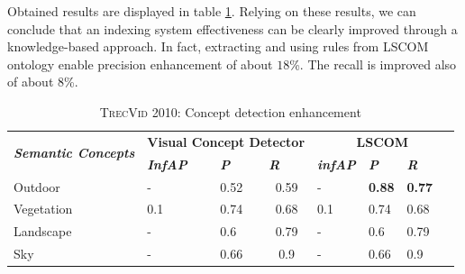 		Obtained results are displayed in table \ref{lscom2}. Relying on these results, 
		we can conclude that an indexing system effectiveness can be clearly improved through 
		a knowledge-based approach. In fact, extracting and using rules from LSCOM ontology enable
		precision enhancement of about $18$\%. The recall is improved also of about $8$\%.

		\begin{table}[h]
			\centering
			\caption{\textsc{TrecVid 2010}: Concept detection enhancement}
			\label{lscom2}
			\begin{tabular}{lp{1.2cm}p{1.2cm}p{1.2cm}p{1.2cm}p{1.2cm}p{1.2cm}}\hline
			\multicolumn{1}{c}{\multirow{2}{*}{\textit{\textbf{Semantic Concepts}}}} & \multicolumn{3}{c}{\textbf{Visual 				Concept Detector}}                                            & \multicolumn{3}{c}{\textbf								{LSCOM}}                                                                         \\ \cline{2-7} 
\multicolumn{1}{c}{}                                                     & \textit{\textbf{InfAP}}   & \textit{\textbf{P}}      & \multicolumn{1}{l|}{\textit{\textbf{R}}} & \textit{\textbf{infAP}}            & \textit{\textbf{P}}               & \textit{\textbf{R~~~~}}               \\ \hline
\multicolumn{1}{l|}{Outdoor}                                             & -                         & 0.52                     & \multicolumn{1}{c|}{0.59}                & -                                  & \textbf{0.88}                     & \textbf{0.77}                     \\
\multicolumn{1}{l|}{Vegetation}                                          & 0.1                       & 0.74                     & \multicolumn{1}{c|}{0.68}                & 0.1                                & 0.74                              & 0.68                              \\
\multicolumn{1}{l|}{Landscape}                                           & -                         & 0.6                      & \multicolumn{1}{c|}{0.79}                & -                                  & 0.6                               & 0.79                              \\
\multicolumn{1}{l|}{Sky}                                                 & -                         & 0.66                     & \multicolumn{1}{c|}{0.9}                 & -                                  & 0.66                              & 0.9                               \\

\end{tabular}
\end{table}
